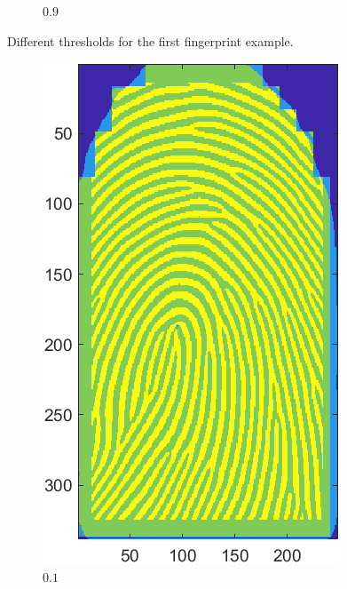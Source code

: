 \documentclass[a4paper]{article}
\begin{document}
\begin{figure}[h!]
\begin{subfigure}[t]{0.2\textwidth}
      \caption{\(0.9\)}
  \end{subfigure}
    \caption{Different thresholds for the first fingerprint example.}
    \label{fig:ex4-1st}
\end{figure}

\begin{figure}[h!]
  \centering
       \begin{subfigure}[t]{0.2\textwidth}
         \centering
         \includegraphics[scale=0.5]{Figures/E4-e2-0.1}
         \caption{\(0.1\)}
     \end{subfigure}%
     \quad
     \begin{subfigure}[t]{0.2\textwidth}
         \centering

\end{subfigure}
\end{figure}
\end{document}
